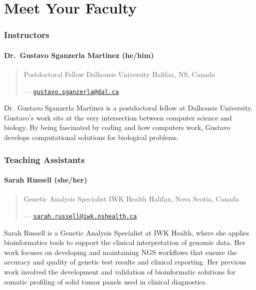 \documentclass[
]{book}
\begin{document}
\chapter{Meet Your Faculty}\label{meet-your-faculty}

\subsection{Instructors}\label{instructors}

\subsubsection{Dr.~Gustavo Sganzerla Martinez (he/him)}\label{dr.-gustavo-sganzerla-martinez-hehim}

\begin{quote}
Postdoctoral Fellow
Dalhousie University
Halifax, NS, Canada

--- \href{mailto:gustavo.sganzerla@dal.ca}{\nolinkurl{gustavo.sganzerla@dal.ca}}
\end{quote}

Dr.~Gustavo Sganzerla Martinez is a postdoctoral fellow at Dalhousie University. Gustavo's work sits at the very intersection between computer science and biology. By being fascinated by coding and how computers work, Gustavo develops computational solutions for biological problems.

\subsection{Teaching Assistants}\label{teaching-assistants}

\subsubsection{Sarah Russell (she/her)}\label{sarah-russell-sheher}

\begin{quote}
Genetic Analysis Specialist
IWK Health
Halifax, Nova Scotia, Canada

--- \href{mailto:sarah.russell@iwk.nshealth.ca}{\nolinkurl{sarah.russell@iwk.nshealth.ca}}
\end{quote}

Sarah Russell is a Genetic Analysis Specialist at IWK Health, where she applies bioinformatics tools to support the clinical interpretation of genomic data. Her work focuses on developing and maintaining NGS workflows that ensure the accuracy and quality of genetic test results and clinical reporting. Her previous work involved the development and validation of bioinformatic solutions for somatic profiling of solid tumor panels used in clinical diagnostics.
\end{document}
